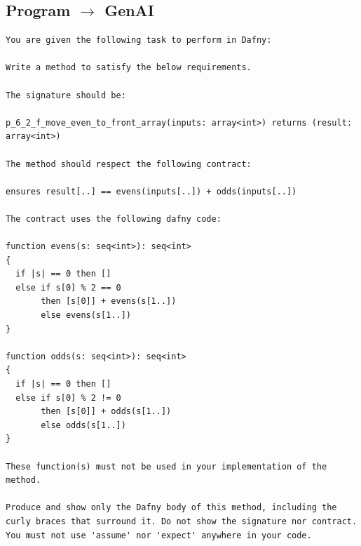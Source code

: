 \documentclass{article}
\begin{document}
\subsection*{Program $\rightarrow$ GenAI}
\begin{lstlisting}
You are given the following task to perform in Dafny:

Write a method to satisfy the below requirements.

The signature should be:

p_6_2_f_move_even_to_front_array(inputs: array<int>) returns (result: array<int>)

The method should respect the following contract:

ensures result[..] == evens(inputs[..]) + odds(inputs[..])

The contract uses the following dafny code:

function evens(s: seq<int>): seq<int>
{
  if |s| == 0 then []
  else if s[0] % 2 == 0
       then [s[0]] + evens(s[1..])
       else evens(s[1..])
}

function odds(s: seq<int>): seq<int>
{
  if |s| == 0 then []
  else if s[0] % 2 != 0
       then [s[0]] + odds(s[1..])
       else odds(s[1..])
}

These function(s) must not be used in your implementation of the method.

Produce and show only the Dafny body of this method, including the curly braces that surround it. Do not show the signature nor contract. You must not use 'assume' nor 'expect' anywhere in your code.
\end{lstlisting}
\end{document}
